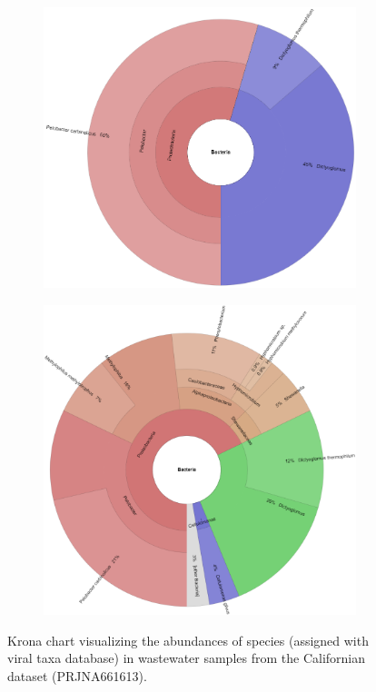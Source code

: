 \begin{figure}[ht!]
\begin{subfigure}[b]{0.3\textwidth}
        \includegraphics[width=1\textwidth]{figures/results/real/krona/krona-sf-sSRR12596175.png}
        \label{fig:results:real:krona-sf-b}
        \end{subfigure}
        \hfill
        \begin{subfigure}[b]{0.3\textwidth}
        \includegraphics[width=1\textwidth]{figures/results/real/krona/krona-sf-all.png}
        \label{fig:results:real:krona-sf-c}
        \end{subfigure}
        \caption{Krona chart visualizing the abundances of species (assigned with viral taxa database) in wastewater samples from the Californian dataset (PRJNA661613).}
    \end{figure}
    
